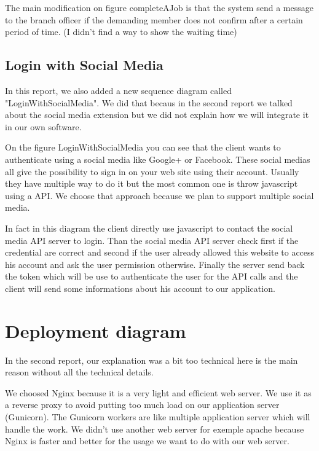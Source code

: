 \documentclass[11pt, a4paper]{article}   	%
\begin{document}
The main modification on figure {completeAJob} is that the system send a message to the branch officer if the demanding member does not confirm after a certain period of time. (I didn't find a way to show the waiting time)

\subsection{Login with Social Media}

In this report, we also added a new sequence diagram called "LoginWithSocialMedia". We did that becaus in the second report we talked about the social media extension but we did not explain how we will integrate it in our own software.


On the figure {LoginWithSocialMedia} you can see that the client wants to authenticate using a social media like Google+ or Facebook. These social medias all give the possibility to sign in on your web site using their account. Usually they have multiple way to do it but the most common one is throw javascript using a API. We choose that approach because we plan to support multiple social media.

In fact in this diagram the client directly use javascript to contact the social media API server to login. Than the social media API server check first if the credential are correct and second if the user already allowed this website to access his account and ask the user permission otherwise. 
Finally the server send back the token which will be use to authenticate the user for the API calls and the client will send some informations about his account to our application.

\section{Deployment diagram}

In the second report, our explanation was a bit too technical here is the main reason without all the technical details.

We choosed Nginx because it is a very light and efficient web server. We use it as a reverse proxy to avoid putting too much load on our application server (Gunicorn). The Gunicorn workers are like multiple application server which will handle the work. We didn't use another web server for exemple apache because Nginx is faster and better for the usage we want to do with our web server.
\end{document}
